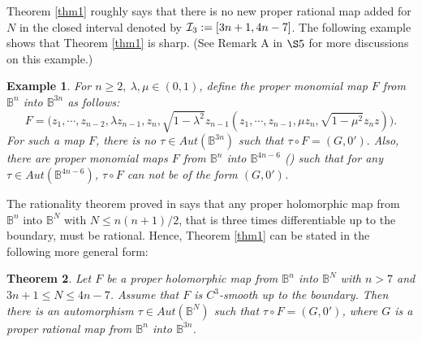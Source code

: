 \documentclass[12pt]{article}
\numberwithin{equation}{section}
\def\BB{{\mathbb B}}
\newtheorem{theorem}{Theorem}[section]
\newtheorem{example}[theorem]{Example}
\begin{document}
Theorem \ref{thm1} roughly says that there is no new proper rational
map added for $N$ in the closed interval denoted by ${\cal
I}_3:=[3n+1,4n-7]$. The following example shows that Theorem
\ref{thm1} is sharp. (See Remark A in $\S 5$ for more discussions on
this example.)
\begin{example} For  $n\ge 2,\ \lambda,\mu\in (0,1)$, define the proper monomial   map $F$ from
${\BB}^n$ into ${\BB}^{3n}$ as follows:
\begin{equation}
\label{example} F=\big(z_1,\cdots,z_{n-2}, \lambda z_{n-1},z_n,
\sqrt{1-\lambda^2} z_{n-1}(z_1,\cdots,z_{n-1},\mu z_n,
\sqrt{1-\mu^2} z_nz)\big).
\end{equation}
For such a map $F$, there is no  $\tau\in Aut({\BB}^{3n})$ such that
$\tau\circ F=(G,0').$
Also,  there are  proper monomial maps $F$ from ${\BB}^n$ into
${\BB}^{4n-6}$ (\cite{HJY}) such that for any $\tau\in
Aut({\BB}^{4n-6})$, $\tau\circ F$ can not be of the form $(G,0')$.
\end{example}
The rationality theorem proved in \cite{Hu2} \cite{HJX2} says that any proper
holomorphic map from ${\BB}^n$ into ${\BB}^N$ with $N\le n(n+1)/2$,
that is three times differentiable up to the boundary, must be
rational. Hence, Theorem \ref{thm1} can be stated in the following
more general form:


\begin{theorem} \label{thmmm1} Let $F$ be a proper holomorphic  map from $\BB^{n}$
into $\BB^{N}$ with $n > 7$ and  $3n+1\le N\le 4n-7$. Assume that
$F$ is $C^3$-smooth up to the boundary.
Then there is an automorphism $\tau\in Aut({\BB}^N)$ such that
$\tau\circ F=(G,0')$, where  $G$ is a  proper  rational map from
${\BB}^n$ into ${\BB}^{3n}$.
\end{theorem}
\end{document}
